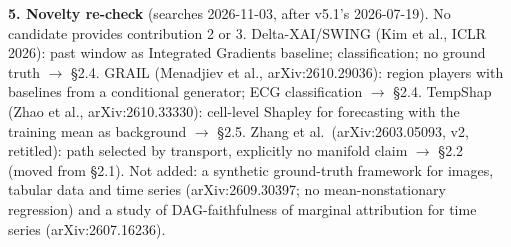 \begin{reviewnotes}
\medskip\textbf{5. Novelty re-check} (searches 2026-11-03, after v5.1's 2026-07-19). No candidate provides contribution 2 or 3.
Delta-XAI/SWING (Kim et al., ICLR 2026): past window as Integrated Gradients baseline; classification; no ground truth $\to$ \S2.4.
GRAIL (Menadjiev et al., arXiv:2610.29036): region players with baselines from a conditional generator; ECG classification $\to$ \S2.4.
TempShap (Zhao et al., arXiv:2610.33330): cell-level Shapley for forecasting with the training mean as background $\to$ \S2.5.
Zhang et al.\ (arXiv:2603.05093, v2, retitled): path selected by transport, explicitly no manifold claim $\to$ \S2.2 (moved from \S2.1).
Not added: a synthetic ground-truth framework for images, tabular data and time series (arXiv:2609.30397; no mean-nonstationary regression) and a study of DAG-faithfulness of marginal attribution for time series (arXiv:2607.16236).
\end{reviewnotes}
